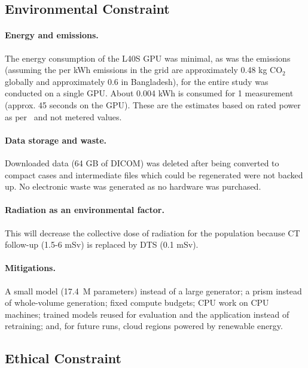 \subsection{Environmental Constraint}

\paragraph{Energy and emissions.} The energy consumption of the L40S GPU was minimal, as was the emissions (assuming the per kWh emissions in the grid are approximately 0.48 kg CO$_2$ globally and approximately 0.6 in Bangladesh), for the entire study was conducted on a single GPU. About 0.004 kWh is consumed for 1 measurement (approx. 45 seconds on the GPU). These are the estimates based on rated power as per~\cite{lannelongue2021green} and not metered values.

\paragraph{Data storage and waste.} Downloaded data (64 GB of DICOM) was deleted after being converted to compact cases and intermediate files which could be regenerated were not backed up. No electronic waste was generated as no hardware was purchased.

\paragraph{Radiation as an environmental factor.} This will decrease the collective dose of radiation for the population because CT follow-up (1.5-6 mSv) is replaced by DTS (0.1 mSv).

\paragraph{Mitigations.} A small model (17.4~M parameters) instead of a large generator; a prism instead of whole-volume generation; fixed compute budgets; CPU work on CPU machines; trained models reused for evaluation and the application instead of retraining; and, for future runs, cloud regions powered by renewable energy.

\subsection{Ethical Constraint}

